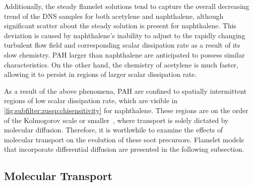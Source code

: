 Additionally, the steady flamelet solutions tend to capture the overall decreasing trend of the DNS samples for both acetylene and naphthalene, although significant scatter about the steady solution is present for naphthalene. This deviation is caused by naphthalene's inability to adjust to the rapidly changing turbulent flow field and corresponding scalar dissipation rate as a result of its slow chemistry. PAH larger than naphthalene are anticipated to possess similar characteristics. On the other hand, the chemistry of acetylene is much faster, allowing it to persist in regions of larger scalar dissipation rate.

As a result of the above phenomena, PAH are confined to spatially intermittent regions of low scalar dissipation rate, which are visible in \cref{fig:subfilter:zussp:chisensitivity} for naphthalene. These regions are on the order of the Kolmogorov scale or smaller~\cite{vaishnavi2008}, where transport is solely dictated by molecular diffusion. Therefore, it is worthwhile to examine the effects of molecular transport on the evolution of these soot precursors. Flamelet models that incorporate differential diffusion are presented in the following subsection.


\subsection{Molecular Transport}
\label{sec:transport:overview:lei}

